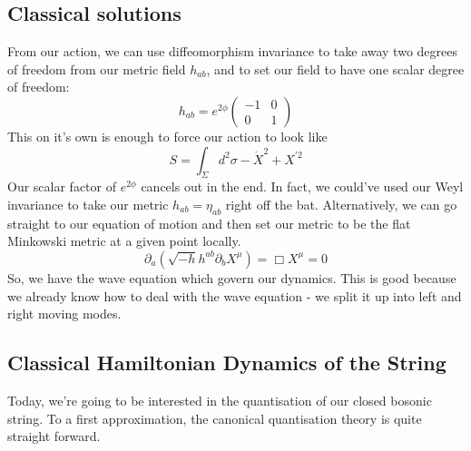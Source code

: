\documentclass[11pt, oneside]{article}   	%
\theoremstyle{slanted}
\begin{document}
\subsection{Classical solutions}
From our action, we can use 
diffeomorphism invariance to take away two degrees 
of freedom from our metric field $ h _{ ab } $, 
and to set our field to have one scalar degree of freedom: 
\[
	h _{ ab }  = e ^{ 2 \phi  } \begin{pmatrix}  
	- 1 & 0 \\ 0 & 1 \end{pmatrix} 
\]  This on it's own is enough to 
force our action to look like 
\[
 S  = \int _{ \Sigma } d ^ 2 \sigma  - \dot{X } ^ 2 + 
 X^{  ' 2 } 
\] Our scalar factor of $ e ^{ 2 \phi } $ 
cancels out in the end. In fact, we could've used 
our Weyl invariance to take our metric 
$ h _{ ab }  = \eta _{ ab } $ right off the bat.
Alternatively, 
we can go straight to our equation of 
motion and then set our metric to 
be the flat Minkowski metric at a given 
point locally. 
\[
	\partial  _ a \left( \sqrt{ - h }  h ^{ ab } 
	\partial  _ b X ^ \mu \right)   =  \Box X ^ \mu  =0  
\] So, we have the wave equation which govern 
our dynamics. 
This is good because we already know how to deal 
with the wave equation - we split it up 
into left and right moving modes. 

\subsection{Classical Hamiltonian Dynamics of the String}
Today, we're 
going to be interested in the quantisation 
of our closed bosonic string. 
To a first approximation, 
the canonical quantisation theory is 
quite straight forward. 
\end{document}
